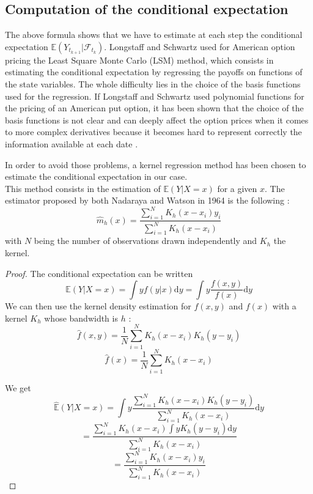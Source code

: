 \documentclass[a4paper,11pt,english]{book}
\begin{document}
\subsection{Computation of the conditional expectation}
\label{subsec:conditional-expectation}
The above formula shows that we have to estimate at each step the conditional expectation $\mathbb{E}(Y_{t_{k+1}}|\mathcal{F}_{t_k})$. Longstaff and Schwartz \cite{schwartz2001valuing} used for American option pricing the Least Square Monte Carlo (LSM) method, which consists in estimating the conditional expectation by regressing the payoffs on functions of the state variables. The whole difficulty lies in the choice of the basis functions used for the regression. If Longstaff and Schwartz used polynomial functions for the pricing of an American put option, it has been shown that the choice of the basis functions is not clear and can deeply affect the option prices when it comes to more complex derivatives because it becomes hard to represent correctly the information available at each date \cite{moreno2003robustness}.

In order to avoid those problems, a kernel regression method has been chosen to estimate the conditional expectation in our case.\\

This method consists in the estimation of $\mathbb{E}(Y|X=x)$ for a given $x$. The estimator proposed by both Nadaraya \cite{nadaraya1964estimating} and Watson \cite{watson1964smooth} in 1964 is the following : $$\hat{m}_{h}(x)=\frac{\sum_{i=1}^{N}K_{h}(x-x_{i})y_{i}}{\sum_{i=1}^{N}K_{h}(x-x_{i})}$$
with $N$ being the number of observations drawn independently and $K_h$ the kernel.\\

\begin{proof}
The conditional expectation can be written $$\mathbb{E}(Y|X=x)=\int yf(y|x) \text{d}y = \int y\frac{f(x,y)}{f(x)} \text{d}y$$
We can then use the kernel density estimation for $f(x,y)$ and $f(x)$ with a kernel $K_{h}$ whose bandwidth is $h$ : $$\hat{f}(x,y) = \frac{1}{N}\sum_{i=1}^{N}K_{h}(x-x_{i})K_{h}(y-y_{i})$$
$$\hat{f}(x) = \frac{1}{N}\sum_{i=1}^{N}K_{h}(x-x_{i})$$

We get $$\hat{\mathbb{E}}(Y|X=x) = \int y\frac{\sum_{i=1}^{N}K_{h}(x-x_{i})K_{h}(y-y_{i})}{\sum_{i=1}^{N}K_{h}(x-x_{i})} \text{d}y$$
$$=\frac{\sum_{i=1}^{N}K_{h}(x-x_{i})\int y K_{h}(y-y_{i}) \text{d}y }{\sum_{i=1}^{N}K_{h}(x-x_{i})}$$
$$=\frac{\sum_{i=1}^{N}K_{h}(x-x_{i})y_{i}}{\sum_{i=1}^{N}K_{h}(x-x_{i})}$$
\end{proof}
\end{document}
